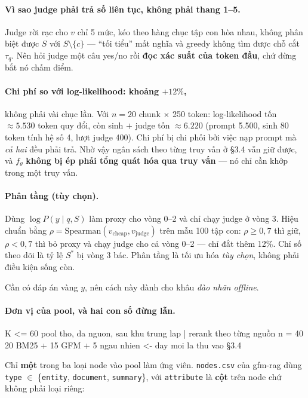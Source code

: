 \documentclass[11pt,a4paper]{article}
\begin{document}
\paragraph{Vì sao judge phải trả số liên tục, không phải thang 1--5.} Judge rời rạc cho $v$
chỉ 5 mức, kéo theo hàng chục tập con hòa nhau, không phân biệt được $S$ với
$S\setminus\{c\}$ --- ``tối tiểu'' mất nghĩa và greedy không tìm được chỗ cắt $\tau_q$. Nên
hỏi judge một câu yes/no rồi \textbf{đọc xác suất của token đầu}, chứ đừng bắt nó chấm điểm.

\paragraph{Chi phí so với log-likelihood: khoảng $+12\%$,} không phải vài chục lần. Với
$n=20$ chunk $\times$ 250 token: log-likelihood tốn ${\approx}5{.}530$ token quy đổi, còn
sinh $+$ judge tốn ${\approx}6{.}220$ (prompt 5.500, sinh 80 token tính hệ số 4, lượt judge
400). Chi phí bị chi phối bởi việc nạp prompt mà \emph{cả hai} đều phải trả. Nhờ vậy ngân
sách theo từng truy vấn ở \S3.4 vẫn giữ được, và $f_\theta$ \textbf{không bị ép phải tổng
quát hóa qua truy vấn} --- nó chỉ cần khớp trong một truy vấn.

\paragraph{Phân tầng (tùy chọn).} Dùng $\log P(y\mid q,S)$ làm proxy cho vòng 0--2 và chỉ
chạy judge ở vòng 3. Hiệu chuẩn bằng $\rho=\mathrm{Spearman}(v_{\text{cheap}},v_{\text{judge}})$
trên mẫu 100 tập con: $\rho\ge 0{,}7$ thì giữ, $\rho<0{,}7$ thì bỏ proxy và chạy judge cho
cả vòng 0--2 --- chỉ đắt thêm 12\%. Chỉ số theo dõi là tỷ lệ $S^*$ bị vòng 3 bác. Phân tầng
là tối ưu hóa \emph{tùy chọn}, không phải điều kiện sống còn.

Cần có đáp án vàng $y$, nên cách này dành cho khâu \emph{đào nhãn offline}.

\paragraph{Đơn vị của pool, và hai con số đừng lẫn.}

\begin{dia}
K <= 60    pool tho, da nguon, sau khu trung lap
   | rerank theo từng nguồn
n  = 40    20 BM25  +  15 GFM  +  5 ngau nhien     <- day moi la thu vao §3.4
\end{dia}

Chỉ \textbf{một} trong ba loại node vào pool làm ứng viên. \texttt{nodes.csv} của gfm-rag
dùng \texttt{type} $\in$ \{\texttt{entity}, \texttt{document}, \texttt{summary}\}, với
\texttt{attribute} là \textbf{cột} trên node chứ không phải loại riêng:
\end{document}
